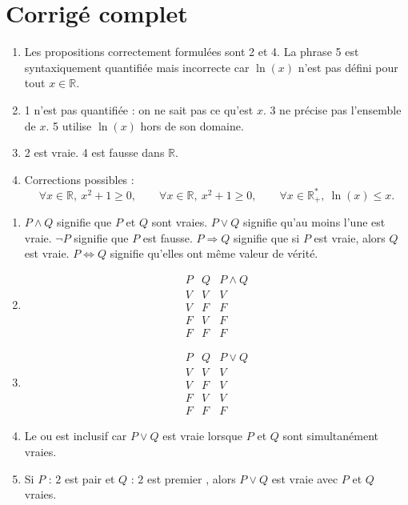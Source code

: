 \documentclass[11pt,a4paper]{article}
\newcommand{\R}{\mathbb{R}}
\newcommand{\non}{\neg}
\newcommand{\et}{\wedge}
\newcommand{\ou}{\vee}
\newcommand{\imp}{\Rightarrow}
\newcommand{\ssi}{\Longleftrightarrow}
\begin{document}
\newpage

\section{Corrigé complet}

\begin{correctionbox}[APP 1]
\begin{enumerate}[label=\alph*)]
    \item Les propositions correctement formulées sont 2 et 4. La phrase 5 est syntaxiquement quantifiée mais incorrecte car \(\ln(x)\) n'est pas défini pour tout \(x\in\R\).
    \item 1 n'est pas quantifiée : on ne sait pas ce qu'est \(x\). 3 ne précise pas l'ensemble de \(x\). 5 utilise \(\ln(x)\) hors de son domaine.
    \item 2 est vraie. 4 est fausse dans \(\R\).
    \item Corrections possibles :
    \[
    \forall x\in\R,\ x^2+1\geq0,\qquad
    \forall x\in\R,\ x^2+1\geq0,\qquad
    \forall x\in\R_+^*,\ \ln(x)\leq x.
    \]
\end{enumerate}
\end{correctionbox}

\begin{correctionbox}[APP 2]
\begin{enumerate}[label=\alph*)]
    \item \(P\et Q\) signifie que \(P\) et \(Q\) sont vraies. \(P\ou Q\) signifie qu'au moins l'une est vraie. \(\non P\) signifie que \(P\) est fausse. \(P\imp Q\) signifie que si \(P\) est vraie, alors \(Q\) est vraie. \(P\ssi Q\) signifie qu'elles ont même valeur de vérité.
    \item
    \[
    \begin{array}{c|c|c}
    P&Q&P\et Q\\ \hline
    V&V&V\\
    V&F&F\\
    F&V&F\\
    F&F&F
    \end{array}
    \]
    \item
    \[
    \begin{array}{c|c|c}
    P&Q&P\ou Q\\ \hline
    V&V&V\\
    V&F&V\\
    F&V&V\\
    F&F&F
    \end{array}
    \]
    \item Le \og ou \fg{} est inclusif car \(P\ou Q\) est vraie lorsque \(P\) et \(Q\) sont simultanément vraies.
    \item Si \(P\) : \og \(2\) est pair \fg{} et \(Q\) : \og \(2\) est premier \fg{}, alors \(P\ou Q\) est vraie avec \(P\) et \(Q\) vraies.
\end{enumerate}
\end{correctionbox}
\end{document}
